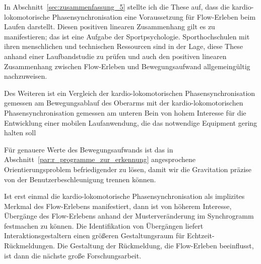 In Abschnitt~\ref{sec:zusammenfassung_5} stellte ich die These auf, dass die kardio-lokomotorische Phasensynchronisation eine Voraussetzung für Flow-Erleben beim Laufen darstellt. Diesen positiven linearen Zusammenhang gilt es zu manifestieren; das ist eine Aufgabe der Sportpsychologie. Sporthochschulen mit ihren menschlichen und technischen Ressourcen sind in der Lage, diese These anhand einer Laufbandstudie zu prüfen und auch den positiven linearen Zusammenhang zwischen Flow-Erleben und Bewegungsaufwand allgemeingültig nachzuweisen. 

Des Weiteren ist ein Vergleich der kardio-lokomotorischen Phasensynchronisation gemessen am Bewegungsablauf des Oberarms mit der kardio-lokomotorischen Phasensynchronisation gemessen am unteren Bein von hohem Interesse für die Entwicklung einer mobilen Laufanwendung, die das notwendige Equipment gering halten soll

Für genauere Werte des Bewegungsaufwands ist das in Abschnitt~\ref{par:r_programme_zur_erkennung} angesprochene Orientierungsproblem befriedigender zu lösen, damit wir die Gravitation präzise von der Benutzerbeschleunigung trennen können. 

Ist erst einmal die kardio-lokomotorische Phasensynchronisation als implizites Merkmal des Flow-Erlebens manifestiert, dann ist von höherem Interesse, Übergänge des Flow-Erlebens anhand der Musterveränderung im Synchrogramm festmachen zu können. Die Identifikation von Übergängen liefert Interaktionsgestaltern einen größeren Gestaltungsraum für Echtzeit-Rückmeldungen. Die Gestaltung der Rückmeldung, die Flow-Erleben beeinflusst, ist dann die nächste große Forschungsarbeit.